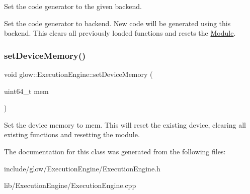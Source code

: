Set the code generator to the given {\ttfamily backend}. 

Set the code generator to {\ttfamily backend}. New code will be generated using this backend. This clears all previously loaded functions and resets the \hyperlink{classglow_1_1_module}{Module}. \mbox{\label{classglow_1_1_execution_engine_aaf3231329fb5af46bfe5e37457ddf0cb}} 
\subsubsection{\texorpdfstring{set\+Device\+Memory()}{setDeviceMemory()}}
{\footnotesize\ttfamily void glow\+::\+Execution\+Engine\+::set\+Device\+Memory (\begin{DoxyParamCaption}\item[{uint64\+\_\+t}]{mem }\end{DoxyParamCaption})\hspace{0.3cm}{\ttfamily [inline]}}

Set the device memory to {\ttfamily mem}. This will reset the existing device, clearing all existing functions and resetting the module. 

The documentation for this class was generated from the following files\+:\begin{DoxyCompactItemize}
\item 
include/glow/\+Execution\+Engine/Execution\+Engine.\+h\item 
lib/\+Execution\+Engine/Execution\+Engine.\+cpp\end{DoxyCompactItemize}
